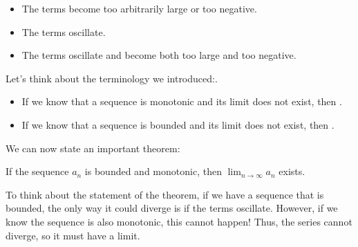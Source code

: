 \documentclass{ximera}
\begin{document}
\begin{itemize}
\item The terms become too arbitrarily large or too negative.
\item The terms oscillate.
\item The terms oscillate and become both too large and too negative. 
\end{itemize}

Let's think about the terminology we introduced:.

\begin{itemize}
\item If we know that a sequence is monotonic and its limit does not exist, then  .

\item If we know that a sequence is bounded and its limit does not exist, then  .

\end{itemize}

We can now state an important theorem:

\begin{theorem}
  If the sequence $a_n$ is bounded and monotonic, then $\lim_{n \to  \infty} a_n $ exists.
\end{theorem}

To think about the statement of the theorem, if we have a sequence that is bounded, the only way it could diverge is if the terms oscillate.  However, if we know the sequence is also monotonic, this cannot happen!  Thus, the series cannot diverge, so it must have a limit.
\end{document}
